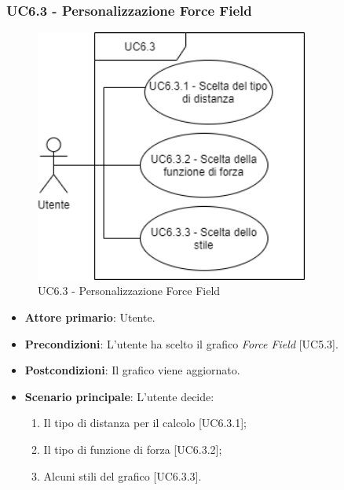 \subsubsection{UC6.3 - Personalizzazione Force Field}
\begin{figure}[h]
\includegraphics[width=9cm]{../Images/UC6.3.png}
\centering
\caption{UC6.3 - Personalizzazione Force Field}
\end{figure}
\begin{itemize}
	\item \textbf{Attore primario}: Utente.
	
	\item \textbf{Precondizioni}: L'utente ha scelto il grafico \textit{Force Field} [UC5.3].
	
	\item \textbf{Postcondizioni}: Il grafico viene aggiornato.
	
	\item \textbf{Scenario principale}: L'utente decide:
	
\begin{enumerate}
\item Il tipo di distanza per il calcolo [UC6.3.1];
\item Il tipo di funzione di forza [UC6.3.2];
\item Alcuni stili del grafico [UC6.3.3].
\end{enumerate}	
		
\end{itemize}

